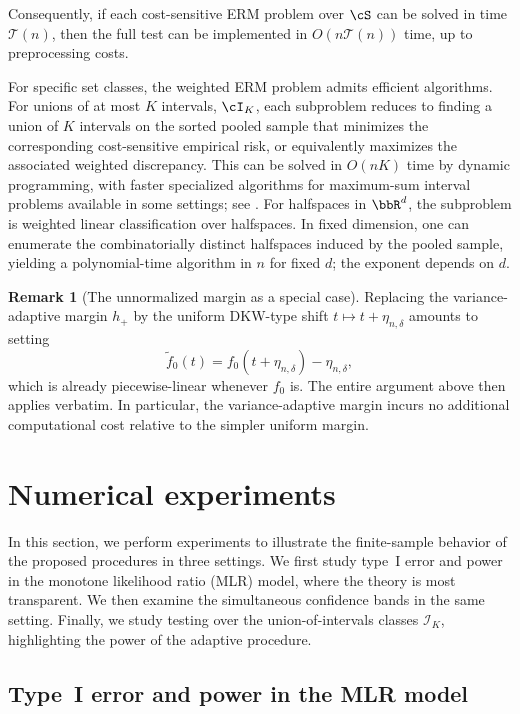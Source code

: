 \documentclass[english]{article}
\theoremstyle{plain}
\theoremstyle{definition}
\newtheorem{remark}{Remark}[section]
\newcommand{\fnull}{f_0}
\newcommand{\etaND}{\eta_{n,\delta}}               %
\newcommand{\hup}{h_+}                             %
\begin{document}
Consequently, if each cost-sensitive ERM problem over \(\cS\) can be solved in
time \(\mathcal T(n)\), then the full test can be implemented in
\(O(n\mathcal T(n))\) time, up to preprocessing costs.

For specific set classes, the weighted ERM problem admits efficient algorithms.
For unions of at most \(K\) intervals, \(\cI_K\), each subproblem reduces to
finding a union of \(K\) intervals on the sorted pooled sample that minimizes
the corresponding cost-sensitive empirical risk, or equivalently maximizes the
associated weighted discrepancy. This can be solved in \(O(nK)\) time by
dynamic programming, with faster specialized algorithms for maximum-sum
interval problems available in some settings; see
\cite{csuros2004maximum,bengtsson2006computing}. For halfspaces in
\(\bbR^d\), the subproblem is weighted linear classification over halfspaces.
In fixed dimension, one can enumerate the combinatorially distinct halfspaces
induced by the pooled sample, yielding a polynomial-time algorithm in \(n\) for
fixed \(d\); the exponent depends on \(d\).


\begin{remark}[The unnormalized margin as a special case]\label{rem:unnorm-special-case}
Replacing the variance-adaptive margin \(\hup\) by the uniform DKW-type shift
\(t \mapsto t + \etaND\) amounts to setting
\[
\widetilde{f}_0(t) = \fnull(t + \etaND) - \etaND,
\]
which is already piecewise-linear whenever \(\fnull\) is. The entire argument
above then applies verbatim. In particular, the variance-adaptive margin
incurs no additional computational cost relative to the simpler uniform
margin.
\end{remark}


\section{Numerical experiments}\label{sec:experiments}

In this section, we perform experiments to illustrate the finite-sample behavior of the proposed procedures in three settings. We first study type~I error and power in the monotone likelihood ratio (MLR) model, where the theory is most transparent. We then examine the simultaneous confidence bands in the same setting. Finally, we study testing over the union-of-intervals classes $\mathcal I_K$, highlighting the power of the adaptive procedure.

\subsection{Type~I error and power in the MLR model}\label{sec:exp-mlr}
\end{document}
